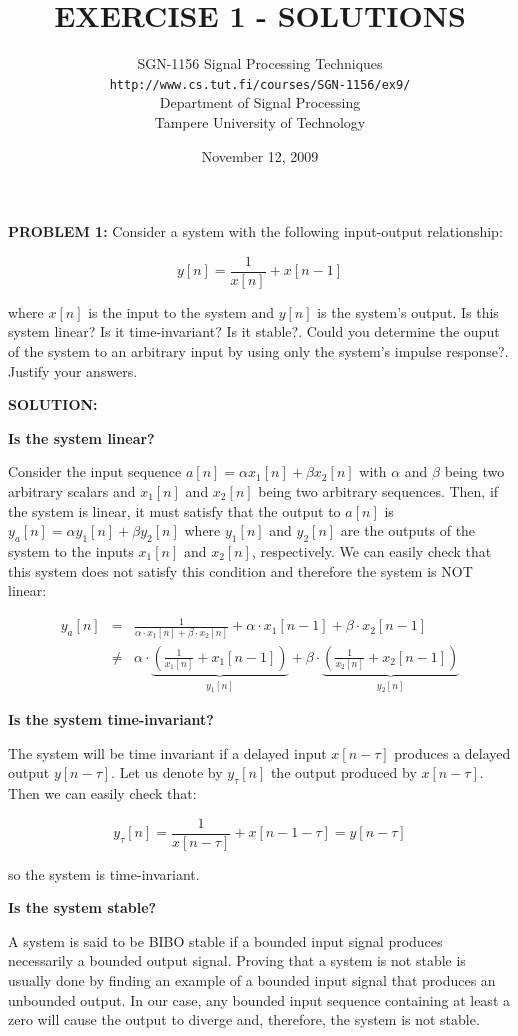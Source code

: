 \documentclass[11pt]{article}
\title{\large{\textbf{EXERCISE 1 - SOLUTIONS}}}
\author{SGN-1156 Signal Processing Techniques\\
\texttt{http://www.cs.tut.fi/courses/SGN-1156/ex9/}\\
Department of Signal Processing\\
Tampere University of Technology}
\date{November 12, 2009}
\begin{document}
\maketitle


\textbf{PROBLEM 1:}  Consider a system with the following input-output relationship:

\[
y[n] = \frac{1}{x[n]}+x[n-1]
\]

where $x[n]$ is the input to the system and $y[n]$ is the system's output. Is this system linear? Is it time-invariant? Is it stable?. Could you determine the ouput of the system to an arbitrary input by using only the system's impulse response?. Justify your answers. 

\vspace{1cm}

\textbf{SOLUTION:}

\textbf{Is the system linear?}

Consider the input sequence $a[n]=\alpha x_1[n]+\beta x_2[n]$ with $\alpha$ and $\beta$ being two arbitrary scalars and $x_1[n]$ and $x_2[n]$ being two arbitrary sequences. Then, if the system is linear, it must satisfy that the output to $a[n]$ is $y_a[n]=\alpha y_1[n] + \beta y_2[n]$ where $y_1[n]$ and $y_2[n]$ are the outputs of the system to the inputs $x_1[n]$ and $x_2[n]$, respectively. We can easily check that this system does not satisfy this condition and therefore the system is NOT linear:

\[
\begin{array}{lll}
y_a[n]&=&\frac{1}{\alpha\cdot x_1[n]+\beta\cdot x_2[n]}+\alpha\cdot x_1[n-1]+\beta\cdot x_2[n-1]\\ &\neq&\alpha\cdot\underbrace{\left(\frac{1}{x_1[n]}+x_1[n-1]\right)}_{y_1[n]}+\beta\cdot\underbrace{\left(\frac{1}{x_2[n]}+x_2[n-1]\right)}_{y_2[n]}
\end{array}
\]

\textbf{Is the system time-invariant?}

The system will be time invariant if a delayed input $x[n-\tau]$ produces a delayed output $y[n-\tau]$. Let us denote by $y_\tau[n]$ the output produced by $x[n-\tau]$. Then we can easily check that:

\[
y_\tau[n] = \frac{1}{x[n-\tau]}+x[n-1-\tau] =y[n-\tau]
\]

so the system is time-invariant.


\textbf{Is the system stable?}

A system is said to be BIBO stable if a bounded input signal produces necessarily a bounded output signal. Proving that a system is not stable is usually done by finding an example of a bounded input signal that produces an unbounded output. In our case, any bounded input sequence containing at least a zero will cause the output to diverge and, therefore, the system is not stable.
\end{document}
